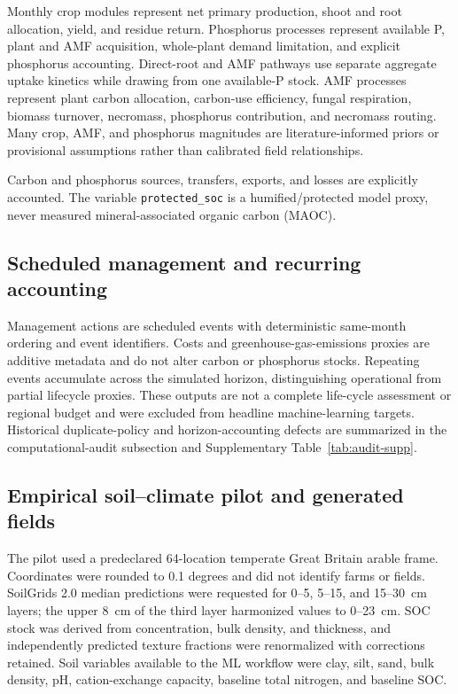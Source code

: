 \documentclass[11pt]{article}
\newcommand{\protectedSOC}{\texttt{protected\_soc}}
\begin{document}
Monthly crop modules represent net primary production, shoot and root allocation, yield, and residue return. Phosphorus processes represent available P, plant and AMF acquisition, whole-plant demand limitation, and explicit phosphorus accounting. Direct-root and AMF pathways use separate aggregate uptake kinetics while drawing from one available-P stock. AMF processes represent plant carbon allocation, carbon-use efficiency, fungal respiration, biomass turnover, necromass, phosphorus contribution, and necromass routing. Many crop, AMF, and phosphorus magnitudes are literature-informed priors or provisional assumptions rather than calibrated field relationships.

Carbon and phosphorus sources, transfers, exports, and losses are explicitly accounted. The variable \protectedSOC{} is a humified/protected model proxy, never measured mineral-associated organic carbon (MAOC).

\subsection{Scheduled management and recurring accounting}

Management actions are scheduled events with deterministic same-month ordering and event identifiers. Costs and greenhouse-gas-emissions proxies are additive metadata and do not alter carbon or phosphorus stocks. Repeating events accumulate across the simulated horizon, distinguishing operational from partial lifecycle proxies. These outputs are not a complete life-cycle assessment or regional budget and were excluded from headline machine-learning targets. Historical duplicate-policy and horizon-accounting defects are summarized in the computational-audit subsection and Supplementary Table~\ref{tab:audit-supp}.

\subsection{Empirical soil--climate pilot and generated fields}

The pilot used a predeclared 64-location temperate Great Britain arable frame. Coordinates were rounded to 0.1 degrees and did not identify farms or fields. SoilGrids 2.0 median predictions were requested for 0--5, 5--15, and 15--30~cm layers; the upper 8~cm of the third layer harmonized values to 0--23~cm. SOC stock was derived from concentration, bulk density, and thickness, and independently predicted texture fractions were renormalized with corrections retained. Soil variables available to the ML workflow were clay, silt, sand, bulk density, pH, cation-exchange capacity, baseline total nitrogen, and baseline SOC.
\end{document}
